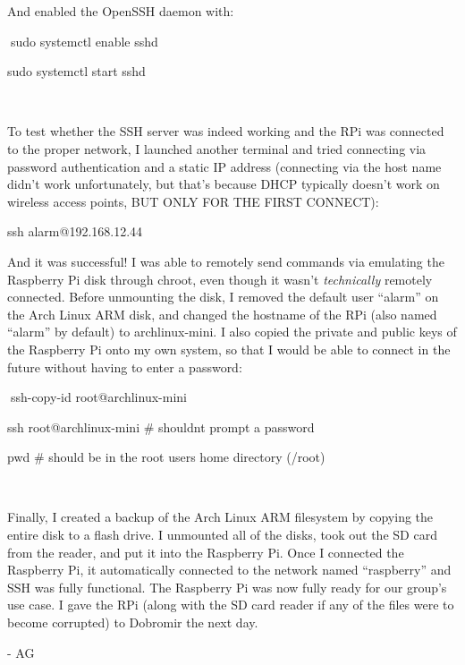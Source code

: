 And enabled the OpenSSH daemon with:

sudo systemctl enable sshd

sudo systemctl start sshd



To test whether the SSH server was indeed working and the RPi was
connected to the proper network, I launched another terminal and tried
connecting via password authentication and a static IP address
(connecting via the host name didn't work unfortunately, but that's
because DHCP typically doesn't work on wireless access points, BUT ONLY
FOR THE FIRST CONNECT):

ssh alarm@192.168.12.44

And it was successful! I was able to remotely send commands via
emulating the Raspberry Pi disk through chroot, even though it wasn't
\emph{technically} remotely connected. Before unmounting the disk, I
removed the default user ``alarm'' on the Arch Linux ARM disk, and
changed the hostname of the RPi (also named ``alarm'' by default) to
archlinux-mini. I also copied the private and public keys of the
Raspberry Pi onto my own system, so that I would be able to connect in
the future without having to enter a password:

ssh-copy-id root@archlinux-mini

ssh root@archlinux-mini \# shouldn\textquotesingle t prompt a password

pwd \# should be in the root user\textquotesingle s home directory
(/root)



Finally, I created a backup of the Arch Linux ARM filesystem by copying
the entire disk to a flash drive. I unmounted all of the disks, took out
the SD card from the reader, and put it into the Raspberry Pi. Once I
connected the Raspberry Pi, it automatically connected to the network
named ``raspberry'' and SSH was fully functional. The Raspberry Pi was
now fully ready for our group's use case. I gave the RPi (along with the
SD card reader if any of the files were to become corrupted) to Dobromir
the next day.

- AG

